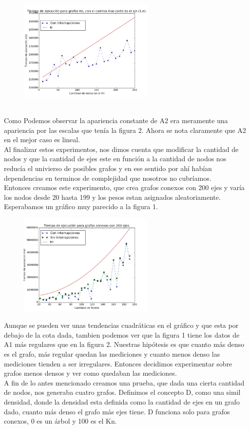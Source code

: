 \documentclass[spanish,12pt]{article}
\begin{document}
\begin{figure}[H]
\centering
\includegraphics[width=0.6\textwidth]{KnsoloOptC100r3000}
\caption{}
\end{figure}
\\
Como Podemos observar la apariencia constante de A2 era meramente una apariencia por las escalas que tenía la figura 2. Ahora se nota claramente que A2 en el mejor caso es lineal.
\\
Al finalizar estos experimentos, nos dimos cuenta que modificar la cantidad de nodos y que la cantidad de ejes este en función a la cantidad de nodos nos reducía el univierso de posibles grafos y en ese sentido por ahí habían dependencias en terminos de complejidad que nosotros no cubríamos.
\\
 Entonces creamos este experimento, que crea grafos conexos con 200 ejes y varía los nodos desde 20 hasta 199 y los pesos estan asignados aleatoriamente. Esperabamos un gráfico muy parecido a la figura 1.

\begin{figure}[H]
\centering
\includegraphics[width=0.6\textwidth]{Conexo200ejesC150r3000}
\caption{}
\end{figure}

Aunque se pueden ver unas tendencias cuadráticas en el gráfico y que esta por debajo de la cota dada, tambien podemos ver que la figura 1 tiene los datos de A1 más regulares que en la figura 2. Nuestras hipótesis es que cuanto más denso es el grafo, más regular quedan las mediciones y cuanto menos denso las mediciones tienden a ser irregulares. Entonces decidimos experimentar sobre grafos menos densos y ver como quedaban las mediciones.
\\
A fin de lo antes mencionado creamos una prueba, que dada una cierta cantidad de nodos, nos generaba cuatro grafos. Definimos el concepto D, como una simil densidad, donde la densidad esta definida como la cantidad de ejes en un grafo dado, cuanto más denso el grafo más ejes tiene. D funciona solo para grafos conexos, 0 es un árbol y 100 es el Kn.
\end{document}
